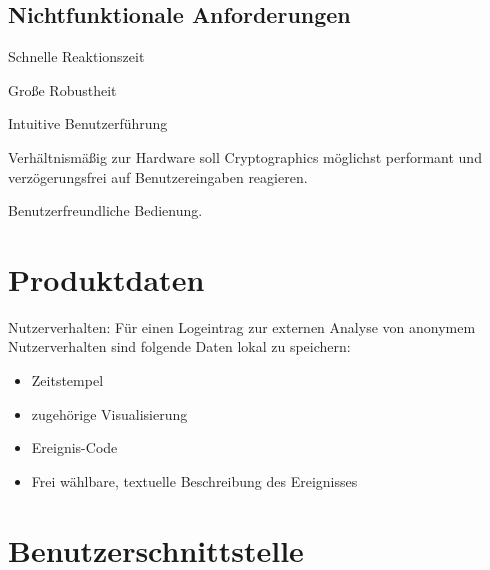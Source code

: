 \documentclass{article}
\begin{document}
\subsection{Nichtfunktionale Anforderungen}

\begin{NA}[start=100]
\item Schnelle Reaktionszeit
\end{NA}

\begin{NA}[start=200]
\item Große Robustheit
\end{NA}

\begin{NA}[start=300]
\item Intuitive Benutzerführung
\end{NA}

\begin{NA}[start=400]
\item Verhältnismäßig zur Hardware soll Cryptographics möglichst performant und verzögerungsfrei auf Benutzereingaben reagieren.
\end{NA}

\begin{NA}[start=500]
\item Benutzerfreundliche Bedienung.
\end{NA}

\section{Produktdaten}
\begin{PD}[start=10]
  \item Nutzerverhalten: Für einen Logeintrag zur externen Analyse von anonymem Nutzerverhalten sind folgende Daten lokal zu speichern:
  \begin{itemize}
    \item Zeitstempel
    \item zugehörige Visualisierung
    \item Ereignis-Code
    \item Frei wählbare, textuelle Beschreibung des Ereignisses
  \end{itemize}
\end{PD}

\section{Benutzerschnittstelle}
\end{document}
